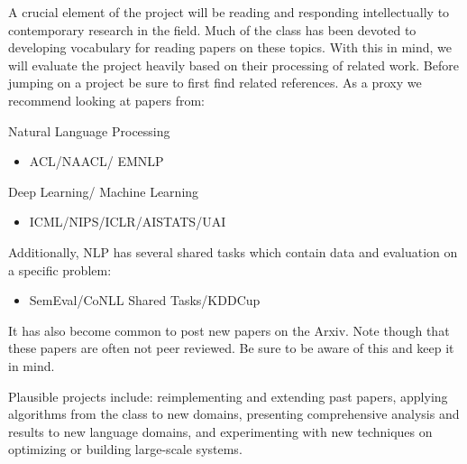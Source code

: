 \documentclass[11pt]{article}
\begin{document}



A crucial element of the project will be reading and responding
intellectually to contemporary research in the field. Much of the
class has been devoted to developing vocabulary for reading papers on
these topics.  With this in mind, we will evaluate the project heavily
based on their processing of related work. Before jumping on a project
be sure to first find related references. As 
a proxy we recommend looking at papers from:

\air 

\noindent Natural Language Processing
\begin{itemize}
\item ACL/NAACL/ EMNLP
\end{itemize}

\noindent  Deep Learning/ Machine Learning
\begin{itemize}
\item ICML/NIPS/ICLR/AISTATS/UAI
\end{itemize}

Additionally, NLP has several shared tasks which contain data and evaluation 
on a specific problem: 

\begin{itemize}
\item SemEval/CoNLL Shared Tasks/KDDCup
\end{itemize}

It has also become common to post new papers on the Arxiv. Note though that these 
papers are often not peer reviewed. Be sure to be aware of this and keep it in mind.

Plausible projects include: reimplementing and extending past papers, 
applying algorithms from the class to new domains, presenting comprehensive 
analysis and results to new language domains, and experimenting with 
new techniques on optimizing or building large-scale systems. 
\end{document}
